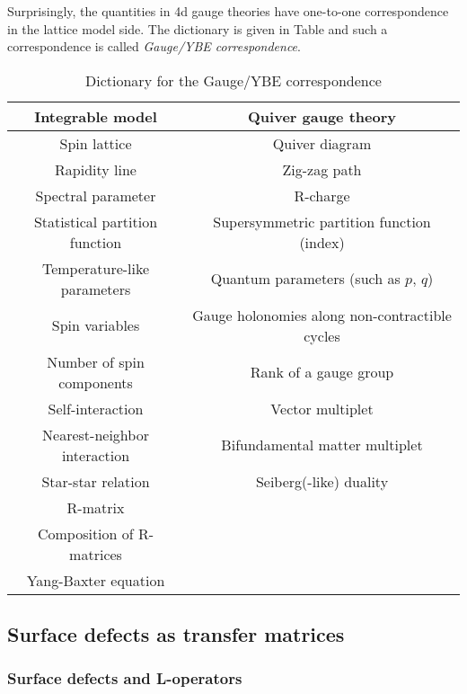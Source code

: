 Surprisingly, the quantities in 4d gauge theories have one-to-one
correspondence in the lattice model side. The dictionary is given
in Table and such a correspondence is called \emph{Gauge/YBE correspondence}.
\begin{table}
\caption{Dictionary for the Gauge/YBE correspondence}
\vspace{0.2cm}
  \centering
    \begin{tabular}{c|c}
Integrable model & Quiver gauge theory  \tabularnewline
\hline
\hline
Spin lattice            & Quiver diagram  \tabularnewline
Rapidity line          & Zig-zag path  \tabularnewline
Spectral parameter & R-charge  \tabularnewline
Statistical partition function    & Supersymmetric partition function (index)  \tabularnewline
Temperature-like parameters & Quantum parameters (such as $p,\,q$)  \tabularnewline
Spin variables       & Gauge holonomies along non-contractible cycles  \tabularnewline
Number of spin components  & Rank of a gauge group  \tabularnewline
Self-interaction    & Vector multiplet  \tabularnewline
Nearest-neighbor interaction & Bifundamental matter multiplet  \tabularnewline
Star-star relation  & Seiberg(-like) duality  \tabularnewline
R-matrix                  &                        \tabularnewline
Composition of R-matrices     &      \tabularnewline
Yang-Baxter equation &                \tabularnewline
    \end{tabular}
\end{table}



\subsection{Surface defects as transfer matrices}

\subsubsection{Surface defects and L-operators}

